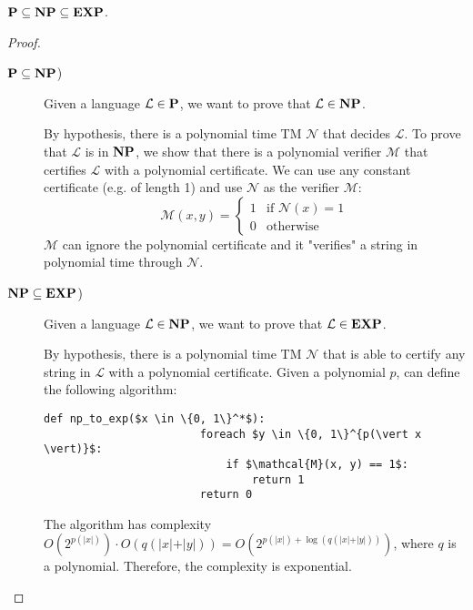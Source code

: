 \begin{theorem}
    $\P \subseteq \NP \subseteq \EXP$.

    \begin{proof}
        \phantom{}
        \begin{description}
            \item[$\P \subseteq \NP$)] 
                Given a language $\mathcal{L} \in \P$, we want to prove that $\mathcal{L} \in \NP$.
                
                By hypothesis, there is a polynomial time TM $\mathcal{N}$ that decides $\mathcal{L}$.
                To prove that $\mathcal{L}$ is in $\NP$, 
                we show that there is a polynomial verifier $\mathcal{M}$ that certifies $\mathcal{L}$ with a polynomial certificate.
                We can use any constant certificate (e.g. of length 1) and 
                use $\mathcal{N}$ as the verifier $\mathcal{M}$:
                \[  
                    \mathcal{M}(x, y) = \begin{cases}
                        1 & \text{if $\mathcal{N}(x) = 1$} \\
                        0 & \text{otherwise}
                    \end{cases}    
                \]
                $\mathcal{M}$ can ignore the polynomial certificate and it "verifies" a string in polynomial time through $\mathcal{N}$.
            
            \item[$\NP \subseteq \EXP$)]
                Given a language $\mathcal{L} \in \NP$, we want to prove that $\mathcal{L} \in \EXP$.
                
                By hypothesis, there is a polynomial time TM $\mathcal{N}$ that is able to certify any string in $\mathcal{L}$ with a polynomial certificate.
                Given a polynomial $p$, can define the following algorithm:
                \begin{lstlisting}[mathescape=true]
                    def np_to_exp($x \in \{0, 1\}^*$):
                        foreach $y \in \{0, 1\}^{p(\vert x \vert)}$:
                            if $\mathcal{M}(x, y) == 1$:
                                return 1
                        return 0
                \end{lstlisting}
                The algorithm has complexity 
                $O(2^{p(\vert x \vert)}) \cdot O(q(\vert x \vert + \vert y \vert)) = O(2^{p(\vert x \vert) + \log(q(\vert x \vert + \vert y \vert))})$,
                where $q$ is a polynomial.
                Therefore, the complexity is exponential.
        \end{description}
    \end{proof}
\end{theorem}


